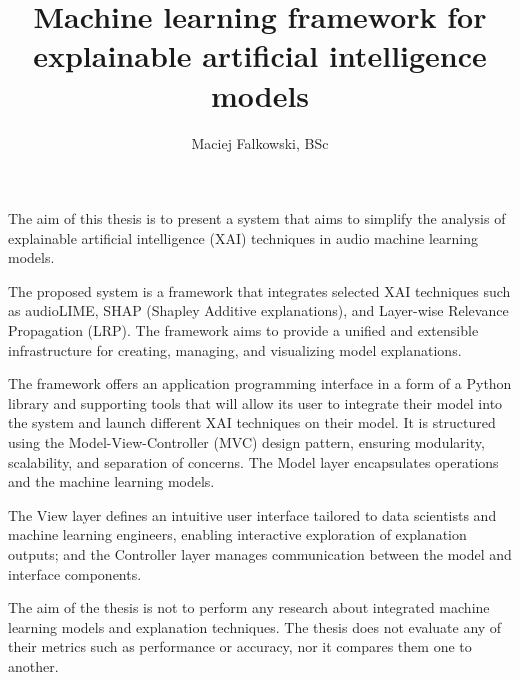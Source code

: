 \documentclass[
    bindingoffset=5mm,  %
    footnoteindent=3mm, %
    hyphenation=true    %
]{src/wut-thesis}
\begin{document}
\title{
    Machine learning framework for explainable artificial intelligence models
}
\author{Maciej Falkowski, BSc}
\date{\the\year}
\maketitle

\cleardoublepage %
\abstract
The aim of this thesis is to present a system that aims to simplify the analysis of explainable artificial
intelligence (XAI) techniques in audio machine learning models.

The proposed system is a framework that integrates selected XAI techniques such as
audioLIME, SHAP (Shapley Additive explanations), and Layer-wise Relevance Propagation (LRP). The framework aims
to provide a unified and extensible infrastructure for creating, managing, and visualizing model explanations.

The framework offers an application programming interface
in a form of a Python library and supporting tools that will allow its user
to integrate their model into the system and launch different XAI techniques on their model.
It is structured using the Model-View-Controller (MVC) design pattern, ensuring modularity,
scalability, and separation of concerns. The Model layer encapsulates operations and the machine learning
models.

The View layer defines an intuitive user interface tailored to data scientists and machine learning engineers, enabling interactive exploration of explanation outputs; and the Controller layer manages communication between the model and interface components.

The aim of the thesis is not to perform any research about integrated machine learning models and explanation
techniques. The thesis does not evaluate any of their metrics such as performance or accuracy, nor it compares them one to another.
\end{document}
